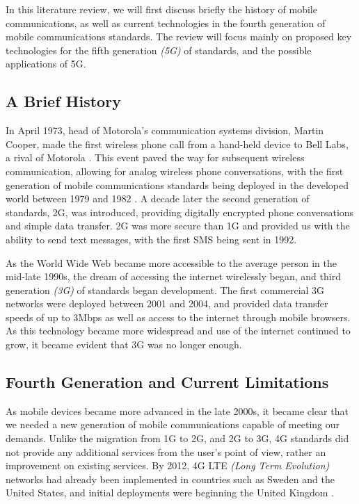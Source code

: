 \documentclass[journal]{IEEEtran}
\begin{document}
In this literature review, we will first discuss briefly the history of mobile communications, as well as current technologies in the fourth generation of mobile communications standards. The review will focus mainly on proposed key technologies for the fifth generation \textit{(5G)} of standards, and the possible applications of 5G.

\subsection{A Brief History}
In April 1973, head of Motorola's communication systems division, Martin Cooper, made the first wireless phone call from a hand-held device to Bell Labs, a rival of Motorola \cite{tomfarhist}. This event paved the way for subsequent wireless communication, allowing for analog wireless phone conversations, with the first generation of mobile communications standards being deployed in the developed world between 1979 and 1982 \cite{evolution}. A decade later the second generation of standards, 2G, was introduced, providing digitally encrypted phone conversations and simple data transfer. 2G was more secure than 1G and provided us with the ability to send text messages, with the first SMS being sent in 1992. 

As the World Wide Web became more accessible to the average person in the mid-late 1990s, the dream of accessing the internet wirelessly began, and third generation \textit{(3G)} of standards began development. The first commercial 3G networks were deployed between 2001 and 2004, and provided data transfer speeds of up to 3Mbps \cite{tomfarhist} as well as access to the internet through mobile browsers. As this technology became more widespread and use of the internet continued to grow, it became evident that 3G was no longer enough.

\subsection{Fourth Generation and Current Limitations} \label{subsec:4g}
As mobile devices became more advanced in the late 2000s, it became clear that we needed a new generation of mobile communications capable of meeting our demands. Unlike the migration from 1G to 2G, and 2G to 3G, 4G standards did not provide any additional services from the user's point of view, rather an improvement on existing services. By 2012, 4G LTE \textit{(Long Term Evolution)} networks had already been implemented in countries such as Sweden and the United States, and initial deployments were beginning the United Kingdom \cite{bbc4g}. 
\end{document}
